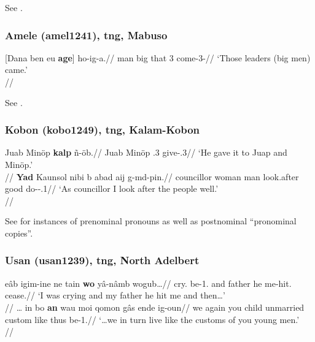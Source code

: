 \documentclass[A4paper]{article}
\begin{document}
See \citet[17f., 166, 181]{renck1975}.

\subsubsection{Amele (amel1241), \gls{tng}, Mabuso}

\ex \begingl
\gla {}[{Dana} {ben} {eu} \textbf{age}] ho-ig-a.//
\glb man big that 3\Pl{} come-3\Pl{}-\Todpst{}//
\glft `Those leaders (big men) came.'\\{\citep[after][210, (283)-(284)]{roberts1987amele}}//
\endgl
\xe

See \citet[162, 201, 209f.]{roberts1987amele}.

\subsubsection{Kobon (kobo1249), \gls{tng}, Kalam-Kobon}

\pex
\a
\begingl
\gla Juab Minöp \textbf{kal\textbari{}p} ñ-öb.//
\glb Juab Minöp \Obj.3\Du{}{} give-\Prf.3\Sg{}//
\glft `He gave it to Juap and Minöp.'\\{\citep[after][108, (264)]{davies1989}}//
\endgl
\a
\begingl
\gla \textbf{Yad} Kaunsol nibi b\textbari{} abad aij g\textbari{}-m\textbari{}d-pin.//
\Sg{} councillor woman man look.after good do-\Habit-\Pfv.1\Sg{}//
\glft `As councillor I look after the people well.' \\\citep[157, (408ad)]{davies1989}//
\endgl
\xe 

See  \citet[107f., 157]{davies1989} for instances of prenominal pronouns as well as postnominal ``pronominal copies''.

\subsubsection{Usan (usan1239), \gls{tng}, North Adelbert} 

\pex
\a \begingl
\gla eâb igim-ine ne tain \textbf{wo} yâ-nâmb wogub\ldots//
\glb cry.\Ss{} be-1\Sg.\Ds{} and father he me-hit.\Ss{} cease.\Ss{}//
\glft `I was crying and my father he hit me and then\ldots' \\
\citep[after][167, (99)]{reesink1987}//
\endgl
\a 
\begingl
\gla \ldots{} in bo \textbf{an} wau moi qomon gâs ende ig-oun//
\glb {} we again you child unmarried custom like thus be-1\Pl.\Prs{}//
\glft `\ldots we in turn live like the customs of you young men.'\\
\citep[part of][190f., (41)]{reesink1987}//
\endgl
\xe 
\end{document}
